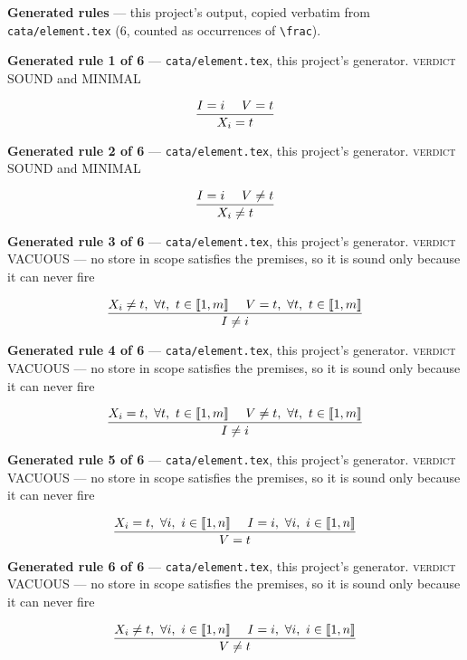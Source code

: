 \documentclass[10pt,a4paper]{article}
\newcommand{\rulebox}[1]{%
  \[\resizebox{\ifdim\width>\linewidth\linewidth\else\width\fi}{!}%
    {$\displaystyle #1$}\]}
\begin{document}
\textbf{Generated rules} --- this project's output, copied verbatim from \texttt{cata/element.tex} (6, counted as occurrences of \texttt{\textbackslash{}frac}).\par

{\small\textbf{Generated rule 1 of 6} --- \texttt{cata/element.tex}, this project's generator. \textsc{verdict} SOUND and MINIMAL\par}
\rulebox{\frac{I=i~~~~V=t}{X_{i}=t}}

{\small\textbf{Generated rule 2 of 6} --- \texttt{cata/element.tex}, this project's generator. \textsc{verdict} SOUND and MINIMAL\par}
\rulebox{\frac{I=i~~~~V \neq t}{X_{i} \neq t}}

{\small\textbf{Generated rule 3 of 6} --- \texttt{cata/element.tex}, this project's generator. \textsc{verdict} VACUOUS --- no store in scope satisfies the premises, so it is sound only because it can never fire\par}
\rulebox{\frac{X_{i} \neq t,~\forall t,~t \in \llbracket1,m\rrbracket~~~~V=t,~\forall t,~t \in \llbracket1,m\rrbracket}{I \neq i}}

{\small\textbf{Generated rule 4 of 6} --- \texttt{cata/element.tex}, this project's generator. \textsc{verdict} VACUOUS --- no store in scope satisfies the premises, so it is sound only because it can never fire\par}
\rulebox{\frac{X_{i}=t,~\forall t,~t \in \llbracket1,m\rrbracket~~~~V \neq t,~\forall t,~t \in \llbracket1,m\rrbracket}{I \neq i}}

{\small\textbf{Generated rule 5 of 6} --- \texttt{cata/element.tex}, this project's generator. \textsc{verdict} VACUOUS --- no store in scope satisfies the premises, so it is sound only because it can never fire\par}
\rulebox{\frac{X_{i}=t,~\forall i,~i \in \llbracket1,n\rrbracket~~~~I=i,~\forall i,~i \in \llbracket1,n\rrbracket}{V=t}}

{\small\textbf{Generated rule 6 of 6} --- \texttt{cata/element.tex}, this project's generator. \textsc{verdict} VACUOUS --- no store in scope satisfies the premises, so it is sound only because it can never fire\par}
\rulebox{\frac{X_{i} \neq t,~\forall i,~i \in \llbracket1,n\rrbracket~~~~I=i,~\forall i,~i \in \llbracket1,n\rrbracket}{V \neq t}}
\end{document}
